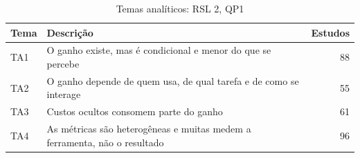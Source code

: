 \begin{table}[htbp]
\centering
\caption{Temas analíticos: RSL 2, QP1}
\label{tab:temas-B1}
\small
\begin{tabular}{lp{11cm}r}
\hline
\textbf{Tema} & \textbf{Descrição} & \textbf{Estudos} \\
\hline
TA1 & O ganho existe, mas é condicional e menor do que se percebe & 88 \\
TA2 & O ganho depende de quem usa, de qual tarefa e de como se interage & 55 \\
TA3 & Custos ocultos consomem parte do ganho & 61 \\
TA4 & As métricas são heterogêneas e muitas medem a ferramenta, não o resultado & 96 \\
\hline
\end{tabular}
\end{table}
